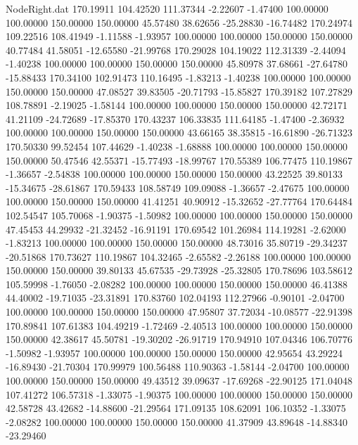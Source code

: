\begin{filecontents}{NodeRight.dat}
 170.19911  104.42520  111.37344    -2.22607   -1.47400  100.00000  100.00000  150.00000  150.00000   45.57480   38.62656  -25.28830  -16.74482
 170.24974  109.22516  108.41949    -1.11588   -1.93957  100.00000  100.00000  150.00000  150.00000   40.77484   41.58051  -12.65580  -21.99768
 170.29028  104.19022  112.31339    -2.44094   -1.40238  100.00000  100.00000  150.00000  150.00000   45.80978   37.68661  -27.64780  -15.88433
 170.34100  102.91473  110.16495    -1.83213   -1.40238  100.00000  100.00000  150.00000  150.00000   47.08527   39.83505  -20.71793  -15.85827
 170.39182  107.27829  108.78891    -2.19025   -1.58144  100.00000  100.00000  150.00000  150.00000   42.72171   41.21109  -24.72689  -17.85370
 170.43237  106.33835  111.64185    -1.47400   -2.36932  100.00000  100.00000  150.00000  150.00000   43.66165   38.35815  -16.61890  -26.71323
 170.50330   99.52454  107.44629    -1.40238   -1.68888  100.00000  100.00000  150.00000  150.00000   50.47546   42.55371  -15.77493  -18.99767
 170.55389  106.77475  110.19867    -1.36657   -2.54838  100.00000  100.00000  150.00000  150.00000   43.22525   39.80133  -15.34675  -28.61867
 170.59433  108.58749  109.09088    -1.36657   -2.47675  100.00000  100.00000  150.00000  150.00000   41.41251   40.90912  -15.32652  -27.77764
 170.64484  102.54547  105.70068    -1.90375   -1.50982  100.00000  100.00000  150.00000  150.00000   47.45453   44.29932  -21.32452  -16.91191
 170.69542  101.26984  114.19281    -2.62000   -1.83213  100.00000  100.00000  150.00000  150.00000   48.73016   35.80719  -29.34237  -20.51868
 170.73627  110.19867  104.32465    -2.65582   -2.26188  100.00000  100.00000  150.00000  150.00000   39.80133   45.67535  -29.73928  -25.32805
 170.78696  103.58612  105.59998    -1.76050   -2.08282  100.00000  100.00000  150.00000  150.00000   46.41388   44.40002  -19.71035  -23.31891
 170.83760  102.04193  112.27966    -0.90101   -2.04700  100.00000  100.00000  150.00000  150.00000   47.95807   37.72034  -10.08577  -22.91398
 170.89841  107.61383  104.49219    -1.72469   -2.40513  100.00000  100.00000  150.00000  150.00000   42.38617   45.50781  -19.30202  -26.91719
 170.94910  107.04346  106.70776    -1.50982   -1.93957  100.00000  100.00000  150.00000  150.00000   42.95654   43.29224  -16.89430  -21.70304
 170.99979  100.56488  110.90363    -1.58144   -2.04700  100.00000  100.00000  150.00000  150.00000   49.43512   39.09637  -17.69268  -22.90125
 171.04048  107.41272  106.57318    -1.33075   -1.90375  100.00000  100.00000  150.00000  150.00000   42.58728   43.42682  -14.88600  -21.29564
 171.09135  108.62091  106.10352    -1.33075   -2.08282  100.00000  100.00000  150.00000  150.00000   41.37909   43.89648  -14.88340  -23.29460

\end{filecontents}
